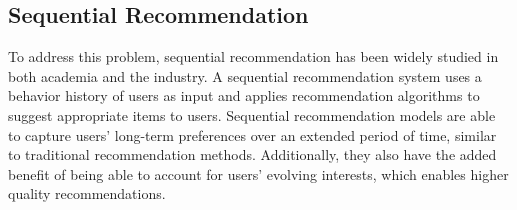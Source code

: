 

\subsection{Sequential Recommendation}
To address this problem, sequential recommendation has been widely studied in both academia and the industry. 
A sequential recommendation system uses a behavior history of users as input and applies recommendation algorithms to suggest appropriate items to users.
Sequential recommendation models are able to capture users' long-term preferences over an extended period of time, similar to traditional recommendation methods. Additionally, they also have the added benefit of being able to account for users' evolving interests, which enables higher quality recommendations.


